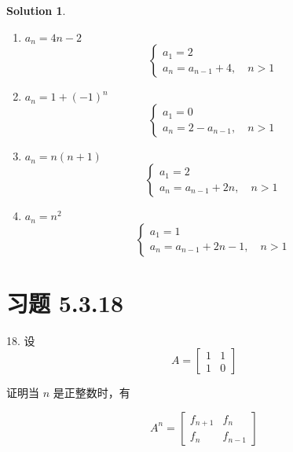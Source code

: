 \documentclass[UTF8]{report}
\newtheorem{solution}{Solution}
\theoremstyle{MyLineTheoremStyle} %
\theoremstyle{MyBlockTheoremStyle} %
\theoremstyle{MySubsubsectionStyle} %
\begin{document}
\begin{solution}
    \begin{enumerate}
        \item $a_n = 4n-2$
        \[
        \begin{cases}
            a_1 = 2 \\
            a_n = a_{n-1} + 4, \quad n > 1
        \end{cases}
        \]

        \item $a_n = 1 + (-1)^n$
        \[
        \begin{cases}
            a_1 = 0 \\
            a_n = 2 - a_{n-1}, \quad n > 1
        \end{cases}
        \]

        \item $a_n = n(n+1)$
        \[
        \begin{cases}
            a_1 = 2 \\
            a_n = a_{n-1} + 2n, \quad n > 1
        \end{cases}
        \]

        \item $a_n = n^2$
        \[
        \begin{cases}
            a_1 = 1 \\
            a_n = a_{n-1} + 2n - 1, \quad n > 1
        \end{cases}
        \]
    \end{enumerate}
\end{solution}

\section{习题 5.3.18}
18. 设
\[
A = \begin{bmatrix}
    1 & 1 \\
    1 & 0
\end{bmatrix}
\]

证明当 $n$ 是正整数时，有

\[
A^n = \begin{bmatrix}
    f_{n+1} & f_n \\
    f_n & f_{n-1}
\end{bmatrix}
\]
\end{document}
